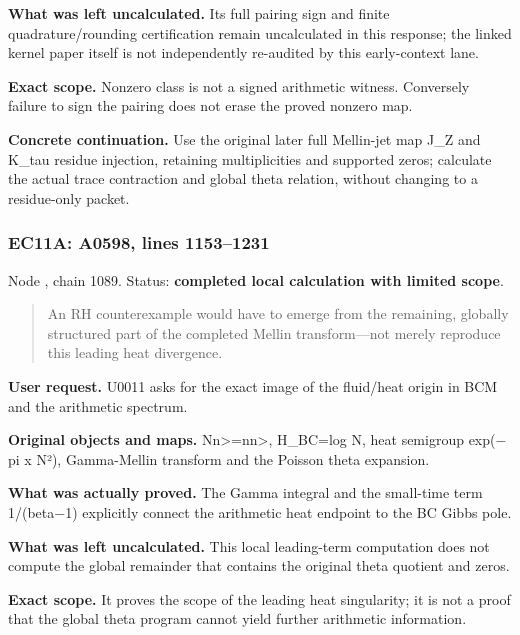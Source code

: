 \textbf{What was left uncalculated.} Its full pairing sign and finite
quadrature/rounding certification remain uncalculated in this response;
the linked kernel paper itself is not independently re-audited by this
early-context lane.

\textbf{Exact scope.} Nonzero class is not a signed arithmetic witness.
Conversely failure to sign the pairing does not erase the proved nonzero
map.

\textbf{Concrete continuation.} Use the original later full Mellin-jet
map J\_Z and K\_tau residue injection, retaining multiplicities and
supported zeros; calculate the actual trace contraction and global theta
relation, without changing to a residue-only packet.

\subsubsection{EC11A: A0598, lines
1153--1231}\label{TranscriptLedgerStage:ec11a-a0598-lines-11531231}

Node \protect{}, chain 1089.
Status: \textbf{completed local calculation with limited scope}.

\begin{quote}
An RH counterexample would have to emerge from the remaining, globally
structured part of the completed Mellin transform---not merely reproduce
this leading heat divergence.
\end{quote}

\textbf{User request.} U0011 asks for the exact image of the fluid/heat
origin in BCM and the arithmetic spectrum.

\textbf{Original objects and maps.}
N\textbar n\textgreater=n\textbar n\textgreater, H\_BC=log N, heat
semigroup exp(\allowbreak{}\ensuremath{−}\allowbreak{}pi x N²),
Gamma-Mellin transform and the Poisson theta expansion.

\textbf{What was actually proved.} The Gamma integral and the small-time
term 1/(beta\allowbreak{}\ensuremath{−}\allowbreak{}1) explicitly
connect the arithmetic heat endpoint to the BC Gibbs pole.

\textbf{What was left uncalculated.} This local leading-term computation
does not compute the global remainder that contains the original theta
quotient and zeros.

\textbf{Exact scope.} It proves the scope of the leading heat
singularity; it is not a proof that the global theta program cannot
yield further arithmetic information.

